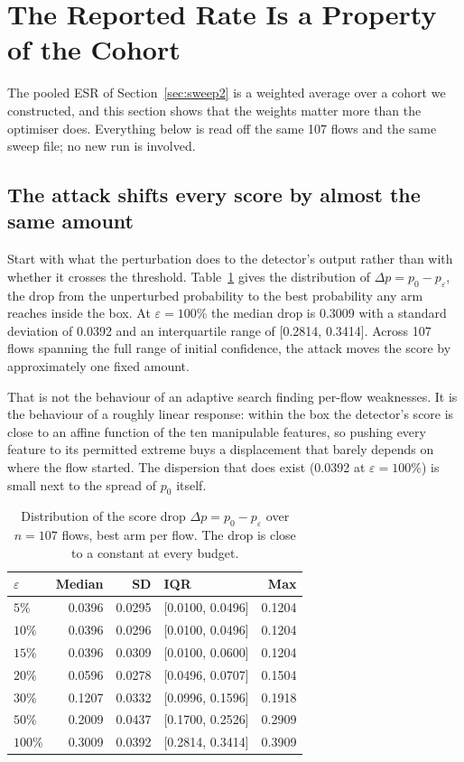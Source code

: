 \documentclass[journal]{IEEEtran}
\theoremstyle{definition}
\newcommand{\CNsweep}{107}
\newcommand{\XShiftMed}{0.3009}
\newcommand{\XShiftSd}{0.0392}
\newcommand{\XShiftQone}{0.2814}
\newcommand{\XShiftQthree}{0.3414}
\begin{document}
\section{The Reported Rate Is a Property of the Cohort}
\label{sec:cohort}

The pooled ESR of Section~\ref{sec:sweep2} is a weighted average over a cohort
we constructed, and this section shows that the weights matter more than the
optimiser does. Everything below is read off the same \CNsweep{} flows and the
same sweep file; no new run is involved.

\subsection{The attack shifts every score by almost the same amount}
\label{sec:shift}

Start with what the perturbation does to the detector's output rather than with
whether it crosses the threshold. Table~\ref{tab:shift} gives the distribution
of $\Delta p = p_0 - p_\varepsilon$, the drop from the unperturbed probability to
the best probability any arm reaches inside the box. At $\varepsilon = 100$\%
the median drop is \XShiftMed{} with a standard deviation of \XShiftSd{} and an
interquartile range of [\XShiftQone, \XShiftQthree]. Across \CNsweep{} flows spanning
the full range of initial confidence, the attack moves the score by
approximately one fixed amount.

That is not the behaviour of an adaptive search finding per-flow weaknesses. It
is the behaviour of a roughly linear response: within the box the detector's
score is close to an affine function of the ten manipulable features, so pushing
every feature to its permitted extreme buys a displacement that barely depends
on where the flow started. The dispersion that does exist (\XShiftSd{} at
$\varepsilon = 100$\%) is small next to the spread of $p_0$ itself.

\begin{table}[t]
\caption{Distribution of the score drop $\Delta p = p_0 - p_\varepsilon$ over
$n=\CNsweep$ flows, best arm per flow. The drop is close to a constant at every
budget.}
\label{tab:shift}
\centering
\footnotesize
\setlength{\tabcolsep}{5pt}
\begin{tabular}{@{}lrrlr@{}}
\toprule
$\varepsilon$ & Median & SD & IQR & Max \\
\midrule
$5\%$ & 0.0396 & 0.0295 & [0.0100, 0.0496] & 0.1204 \\
$10\%$ & 0.0396 & 0.0296 & [0.0100, 0.0496] & 0.1204 \\
$15\%$ & 0.0396 & 0.0309 & [0.0100, 0.0600] & 0.1204 \\
$20\%$ & 0.0596 & 0.0278 & [0.0496, 0.0707] & 0.1504 \\
$30\%$ & 0.1207 & 0.0332 & [0.0996, 0.1596] & 0.1918 \\
$50\%$ & 0.2009 & 0.0437 & [0.1700, 0.2526] & 0.2909 \\
$100\%$ & 0.3009 & 0.0392 & [0.2814, 0.3414] & 0.3909 \\
\bottomrule
\end{tabular}
\end{table}
\end{document}
